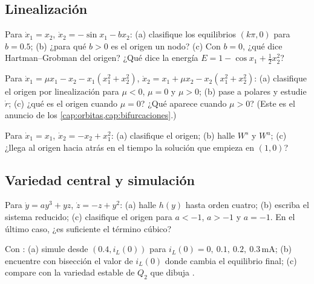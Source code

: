 \subsection*{Linealización}

\begin{problema}\label{prob:bi-pendulo}
Para $\dot x_1=x_2$, $\dot x_2=-\sin x_1-bx_2$: (a) clasifique los equilibrios $(k\pi,0)$ para $b=0.5$; (b) ¿para qué $b>0$ es el origen un nodo? (c) Con $b=0$, ¿qué dice Hartman--Grobman del origen? ¿Qué dice la energía $E=1-\cos x_1+\tfrac12x_2^2$?
\end{problema}

\begin{problema}\label{prob:bi-hopf}
Para $\dot x_1=\mu x_1-x_2-x_1(x_1^2+x_2^2)$, $\dot x_2=x_1+\mu x_2-x_2(x_1^2+x_2^2)$: (a) clasifique el origen por linealización para $\mu<0$, $\mu=0$ y $\mu>0$; (b) pase a polares y estudie $\dot r$; (c) ¿qué es el origen cuando $\mu=0$? ¿Qué aparece cuando $\mu>0$? (Este es el anuncio de los \cref{cap:orbitas,cap:bifurcaciones}.)
\end{problema}

\begin{problema}\label{prob:bi-inestable}
Para $\dot x_1=x_1$, $\dot x_2=-x_2+x_1^2$: (a) clasifique el origen; (b) halle $W^s$ y $W^u$; (c) ¿llega al origen hacia atrás en el tiempo la solución que empieza en $(1,0)$?
\end{problema}

\subsection*{Variedad central y simulación}

\begin{problema}\label{prob:bi-central}
Para $\dot y=ay^3+yz$, $\dot z=-z+y^2$: (a) halle $h(y)$ hasta orden cuatro; (b) escriba el sistema reducido; (c) clasifique el origen para $a<-1$, $a>-1$ y $a=-1$. En el último caso, ¿es suficiente el término cúbico?
\end{problema}

\begin{problema}\label{prob:bi-cuenca}
\etiquetaM{} Con : (a) simule desde $(0.4,i_L(0))$ para $i_L(0)=0,\ 0.1,\ 0.2,\ 0.3$\,mA; (b) encuentre con bisección el valor de $i_L(0)$ donde cambia el equilibrio final; (c) compare con la variedad estable de $Q_2$ que dibuja .
\end{problema}

